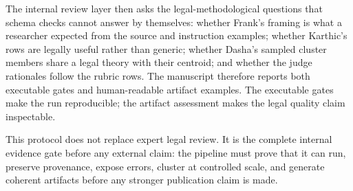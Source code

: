 The internal review layer then asks the legal-methodological questions that
schema checks cannot answer by themselves: whether Frank's framing is what a
researcher expected from the source and instruction examples; whether Karthic's
rows are legally useful rather than generic; whether Dasha's sampled cluster
members share a legal theory with their centroid; and whether the judge
rationales follow the rubric rows. The manuscript therefore reports
both executable gates and human-readable artifact examples. The executable gates
make the run reproducible; the artifact assessment makes the legal quality
claim inspectable.

This protocol does not replace expert legal review. It is the complete internal
evidence gate before any external claim: the pipeline must prove that it can
run, preserve provenance, expose errors, cluster at controlled scale, and
generate coherent artifacts before any stronger publication claim is made.
